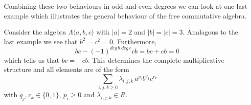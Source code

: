 Combining these two behaviours in odd and even degrees we can look at one last example which
illustrates the general behaviour of the free commutative algebra.

\begin{Example}
 Consider the algebra $\Lambda \langle a,b,c \rangle$ with $|a| = 2$ and $|b| = |c| = 3$.
 Analagous to the last example we see that $b^2 = c^2 = 0$. Furthermore,
 $$ bc - (-1)^{deg \, b \; deg \, c} cb = bc + cb = 0$$
 which tells us that $bc = - cb$. This determines the complete multiplicative structure 
 and all elements are of the form 
 $$ \sum_{i,j,k \geq 0} \lambda_{i,j,k} \, a^{p_i} b^{q_j} c^{r_k}$$
 with  $q_j, r_k \in \lbrace 0,1 \rbrace$, $p_i \geq 0$ and $\lambda_{i,j,k} \in R$.
\end{Example}


